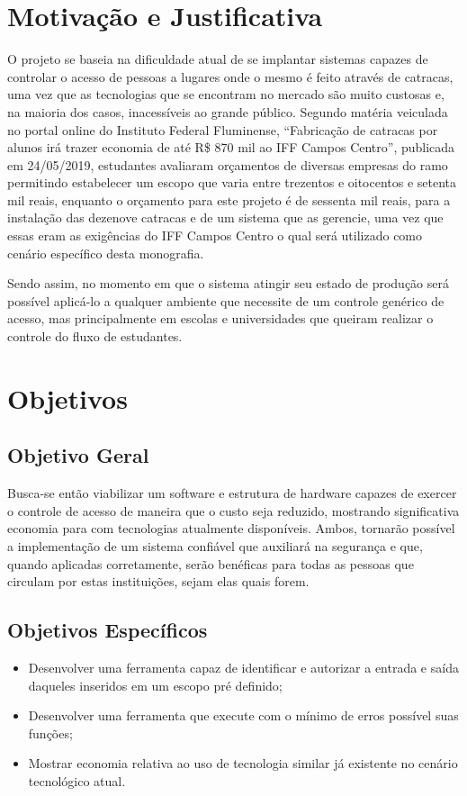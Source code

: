 \section{Motivação e Justificativa}

O projeto se baseia na dificuldade atual de se implantar sistemas capazes de controlar o acesso de pessoas a lugares onde o mesmo é feito através de catracas,
uma vez que as tecnologias que se encontram no mercado são muito custosas e,
na maioria dos casos, inacessíveis ao grande público. Segundo matéria veiculada
no portal online do Instituto Federal Fluminense, “Fabricação de catracas por
alunos irá trazer economia de até R\$ 870 mil ao IFF Campos Centro”, publicada
em 24/05/2019, estudantes avaliaram orçamentos de diversas empresas do ramo permitindo
estabelecer um escopo que varia entre trezentos e oitocentos e setenta mil reais,
enquanto o orçamento para este projeto é de sessenta mil reais, para a instalação
das dezenove catracas e de um sistema que as gerencie, uma vez que essas eram as exigências do IFF Campos Centro o qual será utilizado como cenário específico desta monografia.


Sendo assim, no momento em que o sistema atingir seu estado de produção será possível
aplicá-lo a qualquer ambiente que necessite de um controle genérico de acesso, mas
principalmente em escolas e universidades que queiram realizar o
controle do fluxo de estudantes.

\section{Objetivos}
\subsection{Objetivo Geral}
Busca-se então viabilizar um software e estrutura de hardware capazes de exercer o controle de acesso de maneira que o custo seja reduzido, mostrando significativa economia para com tecnologias atualmente disponíveis. Ambos, tornarão
possível a implementação de um sistema confiável que auxiliará na segurança e que,
quando aplicadas corretamente, serão benéficas para todas as pessoas que circulam
por estas instituições, sejam elas quais forem. 
\subsection{Objetivos Específicos}
\begin{itemize}
    \item Desenvolver uma ferramenta capaz de identificar e autorizar a entrada e saída daqueles
    inseridos em um escopo pré definido;
    \item Desenvolver uma ferramenta que execute com o mínimo de erros possível suas funções;
    \item Mostrar economia relativa ao uso de tecnologia similar já existente no cenário tecnológico atual.
\end{itemize}




